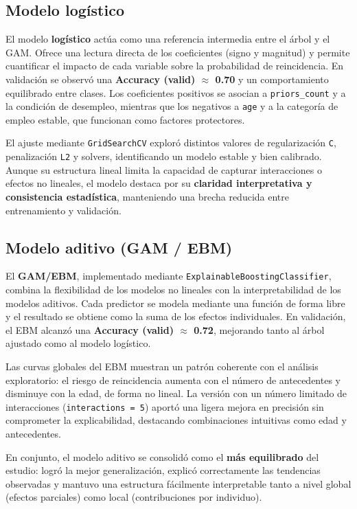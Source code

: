 \subsection{Modelo logístico}

El modelo \textbf{logístico} actúa como una referencia intermedia entre el árbol y el GAM. Ofrece una lectura directa de los coeficientes (signo y magnitud) y permite cuantificar el impacto de cada variable sobre la probabilidad de reincidencia. En validación se observó una \textbf{Accuracy (valid) $\approx$ 0.70} y un comportamiento equilibrado entre clases. Los coeficientes positivos se asocian a \texttt{priors\_count} y a la condición de desempleo, mientras que los negativos a \texttt{age} y a la categoría de empleo estable, que funcionan como factores protectores.

El ajuste mediante \texttt{GridSearchCV} exploró distintos valores de regularización \texttt{C}, penalización \texttt{L2} y solvers, identificando un modelo estable y bien calibrado. Aunque su estructura lineal limita la capacidad de capturar interacciones o efectos no lineales, el modelo destaca por su \textbf{claridad interpretativa y consistencia estadística}, manteniendo una brecha reducida entre entrenamiento y validación.

\subsection{Modelo aditivo (GAM / EBM)}

El \textbf{GAM/EBM}, implementado mediante \texttt{ExplainableBoostingClassifier}, combina la flexibilidad de los modelos no lineales con la interpretabilidad de los modelos aditivos. Cada predictor se modela mediante una función de forma libre y el resultado se obtiene como la suma de los efectos individuales. En validación, el EBM alcanzó una \textbf{Accuracy (valid) $\approx$ 0.72}, mejorando tanto al árbol ajustado como al modelo logístico.

Las curvas globales del EBM muestran un patrón coherente con el análisis exploratorio: el riesgo de reincidencia aumenta con el número de antecedentes y disminuye con la edad, de forma no lineal. La versión con un número limitado de interacciones (\texttt{interactions = 5}) aportó una ligera mejora en precisión sin comprometer la explicabilidad, destacando combinaciones intuitivas como edad y antecedentes.

En conjunto, el modelo aditivo se consolidó como el \textbf{más equilibrado} del estudio: logró la mejor generalización, explicó correctamente las tendencias observadas y mantuvo una estructura fácilmente interpretable tanto a nivel global (efectos parciales) como local (contribuciones por individuo).

